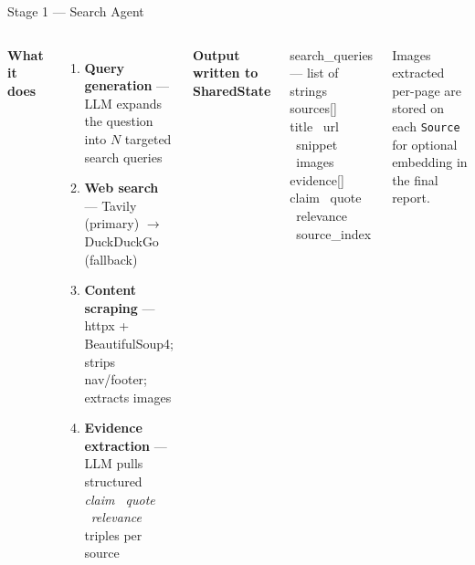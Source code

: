 \documentclass[aspectratio=169, 10pt]{beamer}
\newcommand{\code}[1]{{\ttfamily\small\color{code-red}#1}}
\newcommand{\sidenote}[1]{%
  \vspace{0.2em}%
  \noindent\colorbox{yellow!18}{%
    \parbox{\dimexpr\linewidth-2\fboxsep\relax}{\tiny\color{black!70}#1}%
  }\vspace{0.1em}%
}
\begin{document}
\begin{frame}{Stage 1 --- Search Agent}
  \begin{columns}[T]
      \textbf{\color{aims-lblue}What it does}
      \begin{enumerate}
        \item \textbf{Query generation} --- LLM expands the question into $N$ targeted search queries
        \item \textbf{Web search} --- Tavily (primary) $\to$ DuckDuckGo (fallback)
        \item \textbf{Content scraping} --- httpx + BeautifulSoup4; strips nav/footer; extracts images
        \item \textbf{Evidence extraction} --- LLM pulls structured \emph{claim \textbullet\ quote \textbullet\ relevance} triples per source
      \end{enumerate}
      \textbf{\color{aims-lblue}Output written to SharedState}
      \vspace{0.3em}
      \begin{block}{}
        \scriptsize
        \code{search\_queries} --- list of strings\\[0.35em]
        \code{sources[]}\\
        \hspace{1em}title \textbullet\ url \textbullet\ snippet \textbullet\ images\\[0.35em]
        \code{evidence[]}\\
        \hspace{1em}claim \textbullet\ quote \textbullet\ relevance \textbullet\ source\_index
      \end{block}
      \vspace{0.3em}
      \sidenote{Images extracted per-page are stored on each \texttt{Source} for optional embedding in the final report.}
  \end{columns}
\end{frame}
\end{document}
